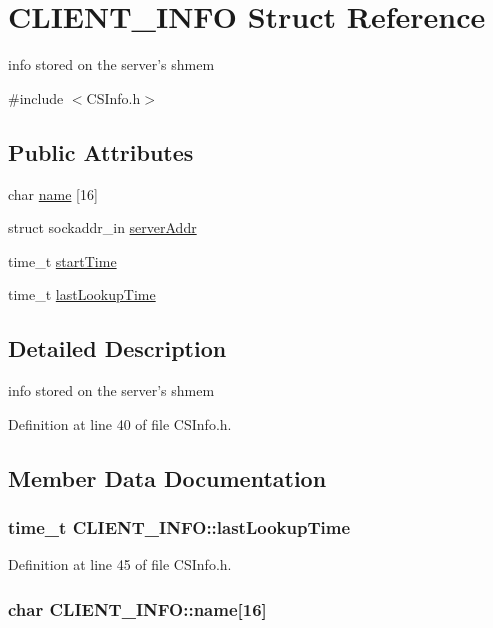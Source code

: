 \hypertarget{structCLIENT__INFO}{
\section{CLIENT\_\-INFO Struct Reference}
\label{structCLIENT__INFO}
}


info stored on the server's shmem  


{\ttfamily \#include $<$CSInfo.h$>$}\subsection*{Public Attributes}
\begin{DoxyCompactItemize}
\item 
char \hyperlink{structCLIENT__INFO_a0218a148bee8e6717325c15ac212c428}{name} \mbox{[}16\mbox{]}
\item 
struct sockaddr\_\-in \hyperlink{structCLIENT__INFO_a22dc8471fb33af605823073b76053bb4}{serverAddr}
\item 
time\_\-t \hyperlink{structCLIENT__INFO_a43b151ec941fff4ce26459dc601f0987}{startTime}
\item 
time\_\-t \hyperlink{structCLIENT__INFO_a4ede3cb19f3db35a04b352f34be5d8d9}{lastLookupTime}
\end{DoxyCompactItemize}


\subsection{Detailed Description}
info stored on the server's shmem 

Definition at line 40 of file CSInfo.h.

\subsection{Member Data Documentation}
\hypertarget{structCLIENT__INFO_a4ede3cb19f3db35a04b352f34be5d8d9}{
\subsubsection[{lastLookupTime}]{\setlength{\rightskip}{0pt plus 5cm}time\_\-t {\bf CLIENT\_\-INFO::lastLookupTime}}}
\label{structCLIENT__INFO_a4ede3cb19f3db35a04b352f34be5d8d9}


Definition at line 45 of file CSInfo.h.\hypertarget{structCLIENT__INFO_a0218a148bee8e6717325c15ac212c428}{
\subsubsection[{name}]{\setlength{\rightskip}{0pt plus 5cm}char {\bf CLIENT\_\-INFO::name}\mbox{[}16\mbox{]}}}
\label{structCLIENT__INFO_a0218a148bee8e6717325c15ac212c428}



